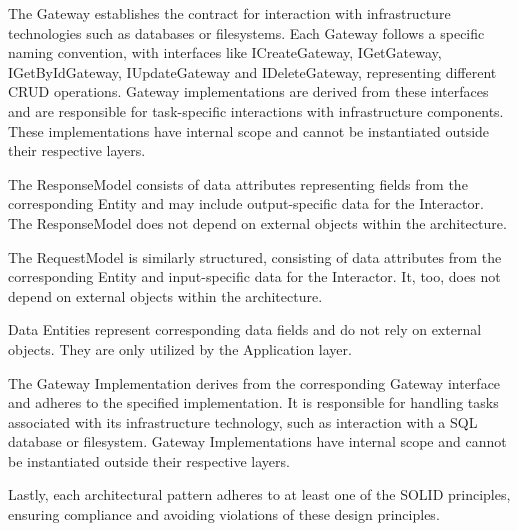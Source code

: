 The Gateway establishes the contract for interaction with infrastructure technologies such
as databases or filesystems. Each Gateway follows a specific naming convention, with
interfaces like ICreateGateway, IGetGateway, IGetByIdGateway, IUpdateGateway and
IDeleteGateway, representing different CRUD operations. Gateway implementations are derived
from these interfaces and are responsible for task-specific interactions with
infrastructure components. These implementations have internal scope and cannot be
instantiated outside their respective layers.

The ResponseModel consists of data attributes representing fields from the corresponding
Entity and may include output-specific data for the Interactor. The ResponseModel does not
depend on external objects within the architecture.

The RequestModel is similarly structured, consisting of data attributes from the
corresponding Entity and input-specific data for the Interactor. It, too, does not depend
on external objects within the architecture.

Data Entities represent corresponding data fields and do not rely on external objects.
They are only utilized by the Application layer.

The Gateway Implementation derives from the corresponding Gateway interface and adheres to
the specified implementation. It is responsible for handling tasks associated with its
infrastructure technology, such as interaction with a SQL database or filesystem. Gateway
Implementations have internal scope and cannot be instantiated outside their respective
layers.

Lastly, each architectural pattern adheres to at least one of the SOLID principles,
ensuring compliance and avoiding violations of these design principles.
